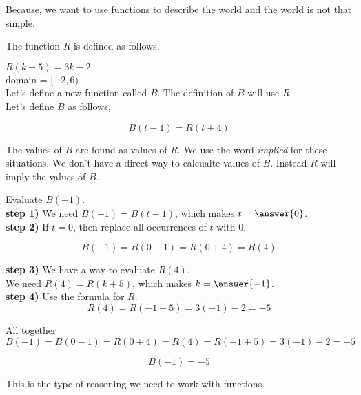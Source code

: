 \documentclass{ximera}
\begin{document}
 Because, we want to use functions to describe the world and the world is not that simple. \\




\begin{example}


The function $R$ is defined as follows.

$R(k + 5) = 3k - 2$ \\
domain = $[-2, 6)$ \\


Let's define a new function called $B$.  The definition of $B$ will use $R$. \\



Let's define $B$ as follows,

\[ 
B(t - 1) = R(t + 4)
\]

The values of $B$ are found as values of $R$.  We use the word \textit{implied} for these situations.  We don't have a direct way to calcualte values of $B$.  Instead $R$ will imply the values of $B$. \\


\begin{question}

Evaluate $B(-1)$. \\


\textbf{step 1)}  We need $B(-1) = B(t - 1)$, which makes $t = \answer{0}$. \\


\textbf{step 2)}  If $t = 0$, then replace all occurrences of $t$ with $0$. 

\[
B(-1) = B(0 - 1) = R(0 + 4) = R(4)
\]


\textbf{step 3)} We have a way to evaluate $R(4)$.\\


We need $R(4) = R(k + 5)$, which makes $k = \answer{-1}$. \\


\textbf{step 4)} Use the formula for $R$.\\

\[
R(4) = R(-1 + 5) = 3(-1) - 2 = -5
\]


All together \\



\[
B(-1) = B(0 - 1) = R(0 + 4) = R(4) = R(-1 + 5) = 3(-1) - 2 = -5
\]


\[
B(-1) = -5
\]

\end{question}


This is the type of reasoning we need to work with functions. \\












\end{example}
\end{document}
